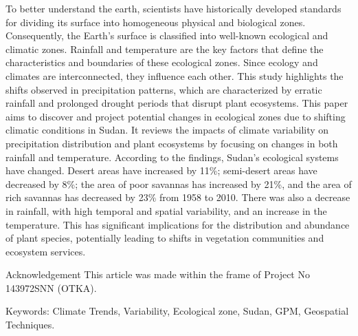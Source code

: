 \noindent

To better understand the earth, scientists have historically developed standards for dividing its surface into homogeneous physical and biological zones. Consequently, the Earth's surface is classified into well-known ecological and climatic zones. Rainfall and temperature are the key factors that define the characteristics and boundaries of these ecological zones. Since ecology and climates are interconnected, they influence each other. This study highlights the shifts observed in precipitation patterns, which are characterized by erratic rainfall and prolonged drought periods that disrupt plant ecosystems. This paper aims to discover and project potential changes in ecological zones due to shifting climatic conditions in Sudan. It reviews the impacts of climate variability on precipitation distribution and plant ecosystems by focusing on changes in both rainfall and temperature. According to the findings, Sudan's ecological systems have changed. Desert areas have increased by 11\%; semi-desert areas have decreased by 8\%; the area of poor savannas has increased by 21\%, and the area of rich savannas has decreased by 23\% from 1958 to 2010. There was also a decrease in rainfall, with high temporal and spatial variability, and an increase in the temperature. This has significant implications for the distribution and abundance of plant species, potentially leading to shifts in vegetation communities and ecosystem services.

Acknowledgement This article was made within the frame of Project No 143972SNN (OTKA).

Keywords: Climate Trends, Variability, Ecological zone, Sudan, GPM, Geospatial Techniques.
\newpage{}
{}
\begin{flushleft}






\end{flushleft}

